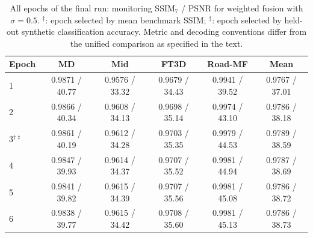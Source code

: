 \begin{table}[htbp]
\centering
\caption{All epochs of the final run: monitoring SSIM$_7$ / PSNR for weighted fusion with $\sigma=0.5$. $^\dagger$: epoch selected by mean benchmark SSIM; $^\ddagger$: epoch selected by held-out synthetic classification accuracy. Metric and decoding conventions differ from the unified comparison as specified in the text.}
\label{tab:epochs}
\scriptsize
\begin{tabular}{lccccc}
\toprule
Epoch & MD & Mid & FT3D & Road-MF & Mean \\
\midrule
1 & 0.9871 / 40.77 & 0.9576 / 33.32 & 0.9679 / 34.43 & 0.9941 / 39.52 & 0.9767 / 37.01 \\
2 & 0.9866 / 40.34 & 0.9608 / 34.13 & 0.9698 / 35.14 & 0.9974 / 43.10 & 0.9786 / 38.18 \\
3$^{\dagger\ddagger}$ & 0.9861 / 40.19 & 0.9612 / 34.28 & 0.9703 / 35.35 & 0.9979 / 44.53 & 0.9789 / 38.59 \\
4 & 0.9847 / 39.93 & 0.9614 / 34.37 & 0.9707 / 35.52 & 0.9981 / 44.94 & 0.9787 / 38.69 \\
5 & 0.9841 / 39.82 & 0.9615 / 34.39 & 0.9707 / 35.56 & 0.9981 / 45.08 & 0.9786 / 38.72 \\
6 & 0.9838 / 39.77 & 0.9615 / 34.42 & 0.9708 / 35.60 & 0.9981 / 45.13 & 0.9786 / 38.73 \\
\bottomrule
\end{tabular}
\end{table}
